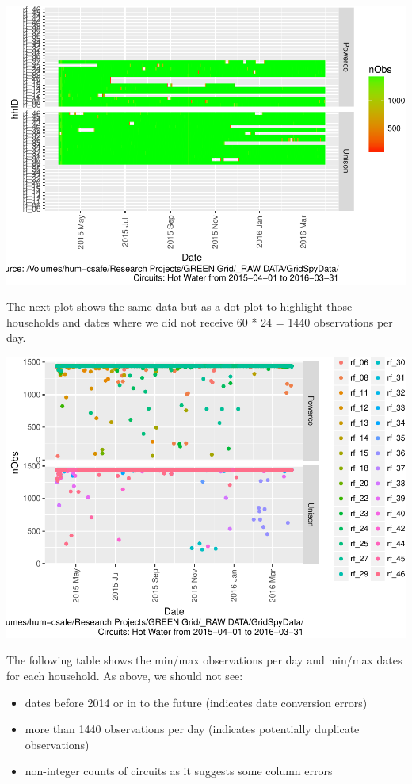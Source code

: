 \documentclass[]{article}
\providecommand{\tightlist}{%
  \setlength{\itemsep}{0pt}\setlength{\parskip}{0pt}}
\begin{document}
\includegraphics{nzGGHouseholdPowerDemandProfile_Hot Water_2015-04-01_2016-03-31_files/figure-latex/loadedFilesObs Tile Plot-1.pdf}

The next plot shows the same data but as a dot plot to highlight those
households and dates where we did not receive 60 * 24 = 1440
observations per day.

\includegraphics{nzGGHouseholdPowerDemandProfile_Hot Water_2015-04-01_2016-03-31_files/figure-latex/loadedFilesObs point plot-1.pdf}

The following table shows the min/max observations per day and min/max
dates for each household. As above, we should not see:

\begin{itemize}
\tightlist
\item
  dates before 2014 or in to the future (indicates date conversion
  errors)
\item
  more than 1440 observations per day (indicates potentially duplicate
  observations)
\item
  non-integer counts of circuits as it suggests some column errors
\end{itemize}
\end{document}
